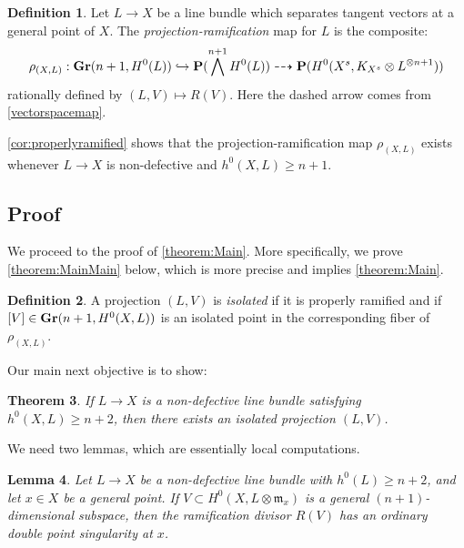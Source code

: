 \documentclass[11pt,reqno]{amsart}
\theoremstyle{plain}
\newtheorem{theorem}{Theorem}[section]
\newtheorem{lemma}[theorem]{Lemma}
\theoremstyle{definition}
\newtheorem{definition}[theorem]{Definition}
\theoremstyle{remark}
\numberwithin{equation}{section}
\renewcommand{\to}{{\longrightarrow}}
\numberwithin{equation}{section}
\begin{document}
\begin{definition}
  \label{def:ProjectionRamification}
  Let $L \to X$ be a line bundle which separates tangent vectors at a general point of $X$. The {\sl projection-ramification} map for $L$ is the composite: 
  \begin{align*}
    \rho_{(X,L)}: {\bf Gr}(n+1,H^{0}(L)) \hookrightarrow {\bf P}(\bigwedge^{n+1}H^{0}(L)) \dashrightarrow {\bf P}(H^{0}(X^{s}, K_{X^{s}} \otimes L^{\otimes n+1}))
  \end{align*}
  rationally defined by $(L,V) \mapsto R(V)$. Here the dashed arrow comes from \ref{vectorspacemap}.
\end{definition}

\autoref{cor:properlyramified} shows that the projection-ramification map $\rho_{(X,L)}$ exists whenever $L \to X$ is non-defective and $h^{0}(X,L) \geq n+1$. 


\subsection{Proof}
We proceed to the proof of \autoref{theorem:Main}. More specifically, we prove \autoref{theorem:MainMain} below, which is more precise and implies \autoref{theorem:Main}.



\begin{definition}
   A projection $(L,V)$ is {\sl isolated} if it is properly ramified and if $[V] \in {\bf Gr}(n+1,H^{0}(X,L))$ is an isolated point in the corresponding fiber of $\rho_{(X,L)}$.
\end{definition}

Our main next objective is to show: 

\begin{theorem}
  \label{theorem:MainMain}
  If $L \to X$ is a non-defective line bundle satisfying $h^{0}(X,L) \geq n+2$, then there exists an isolated projection $(L,V)$.
\end{theorem}

We need two lemmas, which are essentially local computations.

\begin{lemma}\label{lemma:tangentconeRam}
  Let $L \to X$ be a non-defective line bundle with $h^{0}(L) \geq n+2$, and let $x \in X$ be a general point.  If $V \subset H^{0}(X,  L \otimes {\mathfrak m}_{x})$ is a general $(n+1)$-dimensional subspace, then the ramification divisor $R(V)$ has an ordinary double point singularity at $x$. 
\end{lemma}
\end{document}
